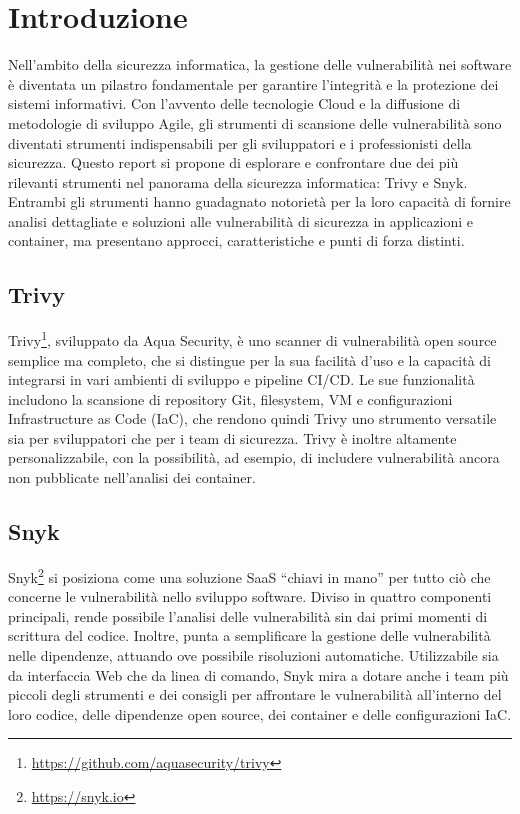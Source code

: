 \chapter{Introduzione}
Nell'ambito della sicurezza informatica, la gestione delle vulnerabilità nei software è diventata un pilastro fondamentale per garantire l'integrità e la protezione dei sistemi informativi. Con l'avvento delle tecnologie Cloud e la diffusione di metodologie di sviluppo Agile, gli strumenti di scansione delle vulnerabilità sono diventati strumenti indispensabili per gli sviluppatori e i professionisti della sicurezza. Questo report si propone di esplorare e confrontare due dei più rilevanti strumenti nel panorama della sicurezza informatica: Trivy e Snyk. Entrambi gli strumenti hanno guadagnato notorietà per la loro capacità di fornire analisi dettagliate e soluzioni alle vulnerabilità di sicurezza in applicazioni e container, ma presentano approcci, caratteristiche e punti di forza distinti.

\section*{Trivy}

Trivy\footnote{\url{https://github.com/aquasecurity/trivy}}, sviluppato da Aqua Security, è uno scanner di vulnerabilità open source semplice ma completo, che si distingue per la sua facilità d'uso e la capacità di integrarsi in vari ambienti di sviluppo e pipeline CI/CD. Le sue funzionalità includono la scansione di repository Git, filesystem, VM e configurazioni Infrastructure as Code (IaC), che rendono quindi Trivy uno strumento versatile sia per sviluppatori che per i team di sicurezza. Trivy è inoltre altamente personalizzabile, con la possibilità, ad esempio, di includere vulnerabilità ancora non pubblicate nell'analisi dei container.

\section*{Snyk}

Snyk\footnote{\url{https://snyk.io}} si posiziona come una soluzione SaaS \enquote{chiavi in mano} per tutto ciò che concerne le vulnerabilità nello sviluppo software. Diviso in quattro componenti principali, rende possibile l'analisi delle vulnerabilità sin dai primi momenti di scrittura del codice. Inoltre, punta a semplificare la gestione delle vulnerabilità nelle dipendenze, attuando ove possibile risoluzioni automatiche. Utilizzabile sia da interfaccia Web che da linea di comando, Snyk mira a dotare anche i team più piccoli degli strumenti e dei consigli per affrontare le vulnerabilità all'interno del loro codice, delle dipendenze open source, dei container e delle configurazioni IaC.

